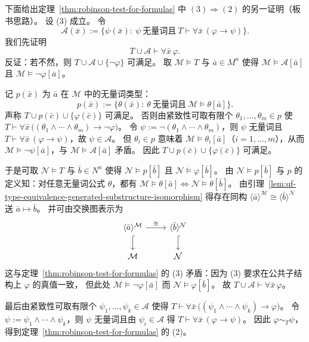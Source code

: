 \documentclass[lang=cn,a4paper,newtx,section]{elegantbook}
\begin{document}
\begin{remark}
下面给出定理~\ref{thm:robinson-test-for-formulas} 中 $(3)\Rightarrow(2)$ 的另一证明（板书思路）。
设 (3) 成立。
令
\[
  \mathcal A(\bar x):=\bigl\{\psi(\bar x):\ \psi\ \text{无量词且}\ T\vdash\forall\bar x\,(\varphi\to\psi)\bigr\}.
\]
我们先证明
\[
  T\cup\mathcal A\vdash\forall\bar x\,\varphi.
\]
反证：若不然，则 $T\cup\mathcal A\cup\{\neg\varphi\}$ 可满足。
取 $\mathcal M\models T$ 与 $\bar a\in M^n$ 使得
$\mathcal M\models\mathcal A[\bar a]$ 且 $\mathcal M\models\neg\varphi[\bar a]$。

记 $p(\bar x)$ 为 $\bar a$ 在 $\mathcal M$ 中的无量词类型：
\[
  p(\bar x):=\{\theta(\bar x):\ \theta\ \text{无量词且}\ \mathcal M\models\theta[\bar a]\}.
\]
声称 $T\cup p(\bar c)\cup\{\varphi(\bar c)\}$ 可满足。
否则由紧致性可取有限个 $\theta_1,\dots,\theta_m\in p$ 使
$T\vdash\forall\bar x\,\bigl((\theta_1\wedge\cdots\wedge\theta_m)\to\neg\varphi\bigr)$。
令 $\psi:=\neg(\theta_1\wedge\cdots\wedge\theta_m)$，则 $\psi$ 无量词且
$T\vdash\forall\bar x\,(\varphi\to\psi)$，故 $\psi\in\mathcal A$。
但 $\theta_i\in p$ 意味着 $\mathcal M\models\theta_i[\bar a]$（$i=1,\dots,m$），从而 $\mathcal M\models\neg\psi[\bar a]$，与 $\mathcal M\models\mathcal A[\bar a]$ 矛盾。
因此 $T\cup p(\bar c)\cup\{\varphi(\bar c)\}$ 可满足。

于是可取 $\mathcal N\models T$ 与 $\bar b\in N^n$ 使得 $\mathcal N\models p[\bar b]$ 且 $\mathcal N\models\varphi[\bar b]$。
由 $\mathcal N\models p[\bar b]$ 与 $p$ 的定义知：对任意无量词公式 $\theta$，都有
$\mathcal M\models\theta[\bar a]\Longleftrightarrow\mathcal N\models\theta[\bar b]$。
由引理~\ref{lem:qf-type-equivalence-generated-substructure-isomorphism} 得存在同构
$\langle\bar a\rangle^{\mathcal M}\cong\langle\bar b\rangle^{\mathcal N}$ 送 $\bar a\mapsto\bar b$。
并可由交换图表示为
\[
\begin{tikzcd}
  \langle\bar a\rangle^{\mathcal M} \arrow[r, "\cong"] \arrow[d, hook] & \langle\bar b\rangle^{\mathcal N} \arrow[d, hook] \\
  \mathcal M & \mathcal N
\end{tikzcd}
\]
这与定理~\ref{thm:robinson-test-for-formulas} 的 (3) 矛盾：因为 (3) 要求在公共子结构上 $\varphi$ 的真值一致，
但此处 $\mathcal M\models\neg\varphi[\bar a]$ 而 $\mathcal N\models\varphi[\bar b]$。
故 $T\cup\mathcal A\vdash\forall\bar x\,\varphi$。

最后由紧致性可取有限个 $\psi_1,\dots,\psi_k\in\mathcal A$ 使得
$T\vdash\forall\bar x\,\bigl((\psi_1\wedge\cdots\wedge\psi_k)\to\varphi\bigr)$。
令 $\psi:=\psi_1\wedge\cdots\wedge\psi_k$，则 $\psi$ 无量词且由 $\psi_i\in\mathcal A$ 得
$T\vdash\forall\bar x\,(\varphi\to\psi)$。
因此 $\varphi\sim_T\psi$，得到定理~\ref{thm:robinson-test-for-formulas} 的 (2)。
\end{remark}
\end{document}
